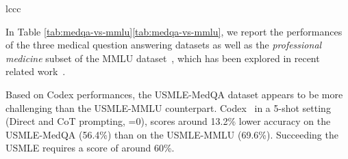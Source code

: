 \documentclass{article} \usepackage{iclr2022_conference,times}
\begin{document}
\begin{table}[h]
\begin{center}
{\begin{tabular}{lccc}
{\begin{multicols}{2}
\begin{table}[H]
\caption{Comparing the USMLE datasets from (test) MedQA~\citep{Jin2021-jo} and (validation/test) MMLU~\citep{Hendrycks2020-jw}. We include the results of the recent Flan-U-PaLM 540B~\citep{Chung2022-lf}. All models use 5 shots.}
\label{tab:medqa-vs-mmlu}
\vspace{-1.0em}
\begin{center}
\end{center}
\end{table}

In Table \ref{tab:medqa-vs-mmlu}\ref{tab:medqa-vs-mmlu}, we report the performances of the three medical question answering datasets as well as the \textit{professional medicine} subset of the MMLU dataset~\citep{Hendrycks2020-jw}, which has been explored in recent related work~\citep{Chung2022-lf}.

Based on Codex performances, the USMLE-MedQA dataset appears to be more challenging than the USMLE-MMLU counterpart. Codex~\citep{Chen2021-sj} in a 5-shot setting (Direct and CoT prompting, =0), scores around 13.2\% lower accuracy on the USMLE-MedQA (56.4\%) than on the USMLE-MMLU  (69.6\%). Succeeding the USMLE requires a score of around 60\%.


\end{multicols}}
\end{tabular}}
\end{center}
\end{table}
\end{document}

